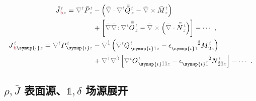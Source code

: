 \begin{subequations}
	\abovedisplayskip=8pt
	\belowdisplayskip=10pt
\begin{align}
\bar{J}^{\;\!\mathcolor{gray}{t}}_{\;\!\textcolor{Maroon}{\text{b}}\mathcolor{gray}{z}} = \mathcolor{gray}{\nabla^t} \bar{P}^{\;\!\mathcolor{gray}{t}}_{\;\!\mathcolor{gray}{z}} &- \left( \mathcolor{gray}{\bar{\nabla} \cdot} \mathcolor{gray}{\nabla^t} \bar{\bar{Q}}^{\;\!\mathcolor{gray}{t}}_{\;\!\mathcolor{gray}{z}} - \mathcolor{gray}{\bar{\nabla} \times} \bar{M}^{\;\!\mathcolor{gray}{t}}_{\;\!\mathcolor{gray}{z}} \right) \label{eq:J-b} \\ &+ \left[ \mathcolor{gray}{\bar{\nabla}} \mathcolor{gray}{\bar{\nabla} \colon}\! \mathcolor{gray}{\nabla^t} \bar{\bar{\bar{O}}}^{\;\!\mathcolor{gray}{t}}_{\;\!\mathcolor{gray}{z}} - \mathcolor{gray}{\bar{\nabla} \times} \left( \mathcolor{gray}{\bar{\nabla} \cdot}  \bar{\bar{N}}^{\;\!\mathcolor{gray}{t}}_{\;\!\mathcolor{gray}{z}} \right) \right] - \cdots~, \\
J^{\;\!\mathcolor{gray}{t}}_{\;\!\textcolor{Maroon}{\text{b}} \symup{\iota} \mathcolor{gray}{z}} = \mathcolor{gray}{\nabla^t} P^{\;\!\mathcolor{gray}{t}}_{\;\! \symup{\iota}\mathcolor{gray}{z}} &- \mathcolor{gray}{\nabla^{\hat{1}}} \left( \mathcolor{gray}{\nabla^t} Q^{\;\!\mathcolor{gray}{t}}_{\;\! \symup{\iota} \mathcolor{gray}{\hat{1}} \mathcolor{gray}{z}} - \epsilon^{\hphantom{\symup{\iota}\hat{1}}\hat{2}}_{\symup{\iota}\mathcolor{gray}{\hat{1}}} M^{\;\!\mathcolor{gray}{t}}_{\;\! \hat{2}\mathcolor{gray}{z}} \right) \label{eq:j-b} \\ &+ \mathcolor{gray}{\nabla^{\hat{1}}} \mathcolor{gray}{\nabla^{\hat{3}}} \left[ \mathcolor{gray}{\nabla^t} O^{\;\!\mathcolor{gray}{t}}_{\;\! \symup{\iota} \mathcolor{gray}{\hat{1}\hat{3}} \mathcolor{gray}{z}} - \epsilon^{\hphantom{\symup{\iota}\hat{1}}\hat{2}}_{\symup{\iota}\mathcolor{gray}{\hat{1}}} N^{\;\!\mathcolor{gray}{t}}_{\;\! \hat{2} \mathcolor{gray}{\hat{3}} \mathcolor{gray}{z}} \right] - \cdots~.
\end{align}
\end{subequations}

\clearpage
\vspace*{-7.5em}

\subsection{${\rho}, \bar{J}$ 表面源、${\mathbb{1}},\delta$ 场源展开}\label{ssec:step-delta}

